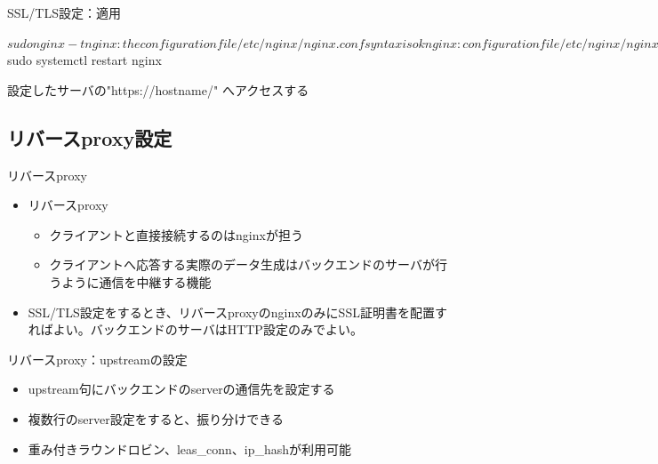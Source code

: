 \begin{frame}[containsverbatim]{SSL/TLS設定：適用}
\begin{commandlinesmall}
$ sudo nginx -t
nginx: the configuration file /etc/nginx/nginx.conf syntax is ok
nginx: configuration file /etc/nginx/nginx.conf test is successful

$ sudo systemctl restart nginx
\end{commandlinesmall}

設定したサーバの"https://hostname/" へアクセスする
\end{frame}


\subsection{リバースproxy設定}

\begin{frame}[containsverbatim]{リバースproxy}
  \begin{itemize}
  \item リバースproxy
    \begin{itemize}
    \item クライアントと直接接続するのはnginxが担う
    \item クライアントへ応答する実際のデータ生成はバックエンドのサーバが行うように通信を中継する機能
    \end{itemize}
  \item SSL/TLS設定をするとき、リバースproxyのnginxのみにSSL証明書を配置すればよい。バックエンドのサーバはHTTP設定のみでよい。
  \end{itemize}
\end{frame}

\begin{frame}[containsverbatim]{リバースproxy：upstreamの設定}
  \begin{itemize}
  \item upstream句にバックエンドのserverの通信先を設定する
  \item 複数行のserver設定をすると、振り分けできる
  \item 重み付きラウンドロビン、leas\_conn、ip\_hashが利用可能
  \end{itemize}

\end{frame}

